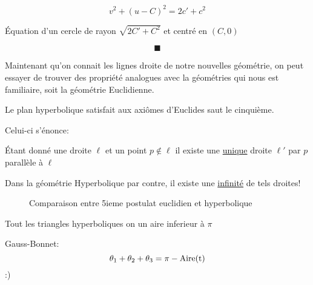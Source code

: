 $$v^2 + (u-C)^2 = 2c' + c^2$$ 


Équation d'un cercle de rayon $\sqrt{2C'+C^2}$ et centré en $(C,0)$  


$$\blacksquare$$ 

Maintenant qu'on connait les lignes droite de notre nouvelles géométrie, on peut essayer de trouver des propriété analogues avec la géométries qui nous est familiaire, soit la géométrie Euclidienne.

Le plan hyperbolique satisfait aux axiômes d'Euclides saut le cinquième.

Celui-ci s'énonce: 

\begin{tcolorbox}[title=Cinquieme postuat]
	 Étant donné une droite $\ell$ et un point $p \notin \ell $ il existe une \underline{unique} droite $\ell'$ par $p$ parallèle à $\ell$ 
\end{tcolorbox}

Dans la géométrie Hyperbolique par contre, il existe une \underline{infinité} de tels droites!


\begin{figure}[ht]
    \centering
    \caption{Comparaison entre 5ieme postulat euclidien et hyperbolique}
    \label{fig:comparaison-entre-5ieme-postulat-euclidien-et-hyperbolique}
\end{figure}

Tout les triangles hyperboliques on un aire inferieur à $\pi$ 

Gauss-Bonnet: $$\theta_1 + \theta_2 + \theta_3  = \pi -\rm{Aire}(t)$$ 
:)

